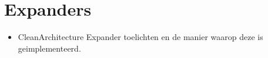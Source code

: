 \section{Expanders} \label{sec:artifact_expanders}

\begin{itemize}
    \item CleanArchitecture Expander toelichten en de manier waarop deze is geimplementeerd.
\end{itemize}